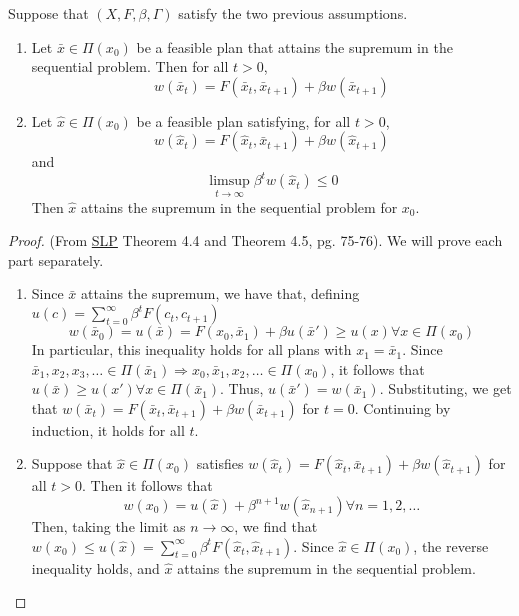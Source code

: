 \documentclass[10pt]{article}
\begin{document}
\begin{theorem}\label{thm:principle_optimal_two}
	 Suppose that $(X,F,\beta,\Gamma)$ satisfy the two previous assumptions. 
	\begin{enumerate}
		\item Let $\bar{x} \in \Pi(x_0)$ be a feasible plan that attains the supremum in the sequential problem. Then for all $t > 0$,
		\[
		w(\bar{x}_t) = F(\bar{x}_t,\bar{x}_{t+1}) + \beta w(\bar{x}_{t+1})
		\]
		\item Let $\hat{x} \in \Pi(x_0)$ be a feasible plan satisfying, for all $t > 0$,
		\[
		w(\hat{x}_t) = F(\hat{x}_t,\bar{x}_{t+1}) + \beta w(\hat{x}_{t+1})
		\]
		and
		\[
		\limsup_{t\to\infty} \beta^t w(\hat{x}_t) \le 0
		\]
		Then $\hat{x}$ attains the supremum in the sequential problem for $x_0$.
	\end{enumerate}
\end{theorem}
\begin{proof}
	(From \href{https://www.hup.harvard.edu/books/9780674750968}{SLP} Theorem 4.4 and Theorem 4.5, pg. 75-76). We will prove each part separately.
	\begin{enumerate}
		\item Since $\bar{x}$ attains the supremum, we have that, defining $u(c) = \sum_{t=0}^\infty \beta^t F(c_t,c_{t+1})$
		\[
		w(\bar{x}_0) = u(\bar{x}) = F(x_0,\bar{x}_1) + \beta u(\bar{x}') \ge u(x) \forall x \in \Pi(x_0)
		\]
		In particular, this inequality holds for all plans with $x_1 = \bar{x}_1$. Since $\bar{x}_1,x_2,x_3,\dots \in \Pi(\bar{x}_1) \Rightarrow x_0,\bar{x}_1,x_2,\dots \in \Pi(x_0)$, it follows that $u(\bar{x}) \ge u(x') \forall x \in \Pi(\bar{x}_1)$. Thus, $u(\bar{x}') = w(\bar{x}_1)$. Substituting, we get that $w(\bar{x}_t) = F(\bar{x}_t,\bar{x}_{t+1}) + \beta w(\bar{x}_{t+1})$ for $t = 0$. Continuing by induction, it holds for all $t$.
		\item Suppose that $\hat{x} \in \Pi(x_0)$ satisfies $w(\hat{x}_t) = F(\hat{x}_t,\bar{x}_{t+1}) + \beta w(\hat{x}_{t+1})$ for all $t > 0$. Then it follows that
		\[
		w(x_0) = u(\hat{x}) + \beta^{n+1} w(\hat{x}_{n+1}) \forall n = 1,2,\dots
		\]
		Then, taking the limit as $n \to \infty$, we find that $w(x_0) \le u(\hat{x}) = \sum_{t=0}^\infty \beta^t F(\hat{x}_t,\hat{x}_{t+1})$. Since $\hat{x} \in \Pi(x_0)$, the reverse inequality holds, and $\hat{x}$ attains the supremum in the sequential problem.
	\end{enumerate}
\end{proof}
\end{document}
